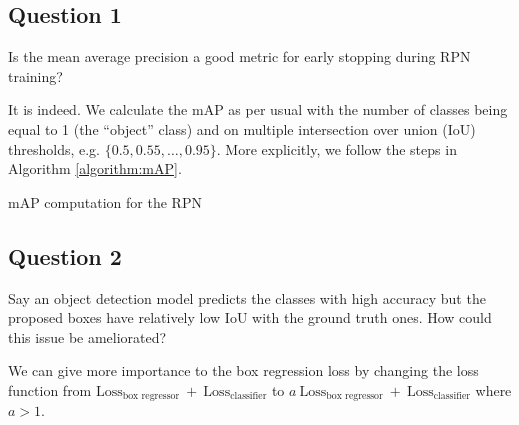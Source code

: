 \documentclass{article}
\begin{document}
\subsection{Question 1}
\begin{tcolorbox}
    Is the mean average precision a good metric for early stopping during RPN training?
\end{tcolorbox}
It is indeed. We calculate the mAP as per usual with the number of classes being equal to 1 (the “object” class) and on multiple intersection over union (IoU) thresholds, e.g. \(\{0.5, 0.55, \dots, 0.95\}\). More explicitly, we follow the steps in Algorithm \ref{algorithm:mAP}.
\begin{algorithm}[h]
    \begin{algorithmic}[1]
        \Else
        \EndIf
        \EndFor
        \EndFor
    \end{algorithmic}
    \caption{mAP computation for the RPN}
    \label{algorithm:mAP}
\end{algorithm}

\subsection{Question 2}
\begin{tcolorbox}
    Say an object detection model predicts the classes with high accuracy but the proposed boxes have relatively low IoU with the ground truth ones. How could this issue be ameliorated?
\end{tcolorbox}
We can give more importance to the box regression loss by changing the loss function
from \(\text{Loss}_\text{box regressor}\ +\ \text{Loss}_\text{classifier}\)
to \(a\ \text{Loss}_\text{box regressor}\ +\ \text{Loss}_\text{classifier}\)
where \(a > 1\).
\end{document}
